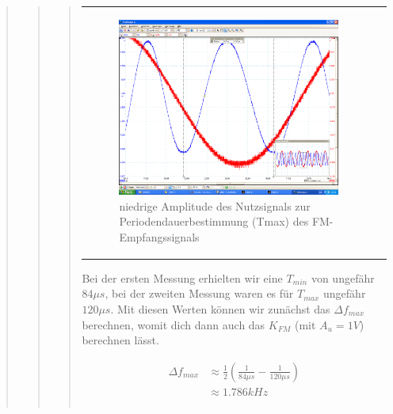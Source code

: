 \begin{quote}
\begin{quote}
\begin{quote}
\begin{center}
\begin{tabular}{ll}
\begin{minipage}{0.6\textwidth}
                     \begin{figure}[H]
                        \label{fig:}
                        \includegraphics[scale=0.5, trim = 2cm 6.5cm 1.5cm
                        8.5cm, clip]{./Bilder/aufgabe_4_12_sinus_low-ampl}
                        \caption{niedrige Amplitude des Nutzsignals zur
                        Periodendauerbestimmung (Tmax) des FM-Empfangssignals}
                    \end{figure}
               \vspace{-1.5em}

                \end{minipage}

            \end{tabular}
            \end{center}
        
        Bei der ersten Messung erhielten wir eine $T_{min}$ von ungefähr 
        $84\mu s$, bei der zweiten Messung waren es für $T_{max}$ ungefähr 
        $120\mu s$. Mit diesen Werten können wir zunächst das $\Delta f_{max}$
        berechnen, womit dich dann auch das $K_{FM}$ (mit $A_u = 1V$) berechnen
        lässt.
        
      \begin{equation*}
       \begin{split}
		\Delta f_{max} &\approx \frac{1}{2} (\frac{1}{84\mu s} - \frac{1}{120\mu s})\\
					   &\approx 1.786 kHz \\
		\\			
			

\end{split}
\end{equation*}
\end{quote}
\end{quote}
\end{quote}

